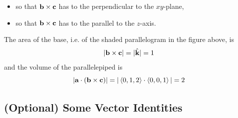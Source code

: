 \begin{eg}
\begin{itemize}
both $\vb$ and $\vc$ lie in the $xy$-plane, 
\item[$\circ$]
so that $\mathbf{b}\times\mathbf{c}$ has to the perpendicular to the $xy$-plane,
\item[$\circ$]
so that $\mathbf{b}\times\mathbf{c}$ has to the parallel to the $z$-axis.
\end{itemize}
The area of the base, i.e. of the shaded parallelogram in the figure above,
is
\begin{equation*}
|\mathbf{b}\times\mathbf{c}| = |\hat{\mathbf{k}}| =1
\end{equation*}
and the volume of the parallelepiped is
\begin{equation*}
|\mathbf{a}\cdot (\mathbf{b}\times\mathbf{c})|
= |\left< 0,1,2\right>\cdot\left< 0,0,1\right>|=2
\end{equation*}

\end{eg}

\subsection{(Optional) Some Vector Identities}
\label{sec vector identities}

